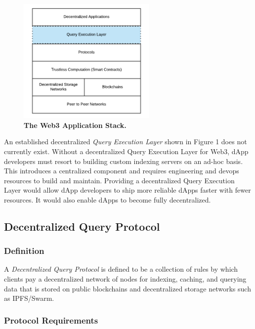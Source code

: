 \documentclass[12pt]{article}
\begin{document}
\setcounter{figure}{0}
\begin{figure}[H]
  \caption{\textbf{The Web3 Application Stack.}}
  \begin{center}
    \includegraphics[width=0.6\textwidth]{media/image8.png}
  \end{center}
\end{figure}

An established decentralized \textit{Query Execution Layer} shown in Figure 1
does not currently exist. Without a decentralized Query Execution Layer for
Web3, dApp developers must resort to building custom indexing servers on an
ad-hoc basis. This introduces a centralized component and requires engineering
and devops resources to build and maintain. Providing a decentralized Query
Execution Layer would allow dApp developers to ship more reliable dApps faster
with fewer resources. It would also enable dApps to become fully decentralized.

\subsection{Decentralized Query Protocol}

\subsubsection*{Definition}

A \textit{Decentralized Query Protocol} is defined to be a collection of rules
by which clients pay a decentralized network of nodes for indexing, caching, and
querying data that is stored on public blockchains and decentralized storage
networks such as IPFS/Swarm.

\subsubsection*{Protocol Requirements}
\end{document}
